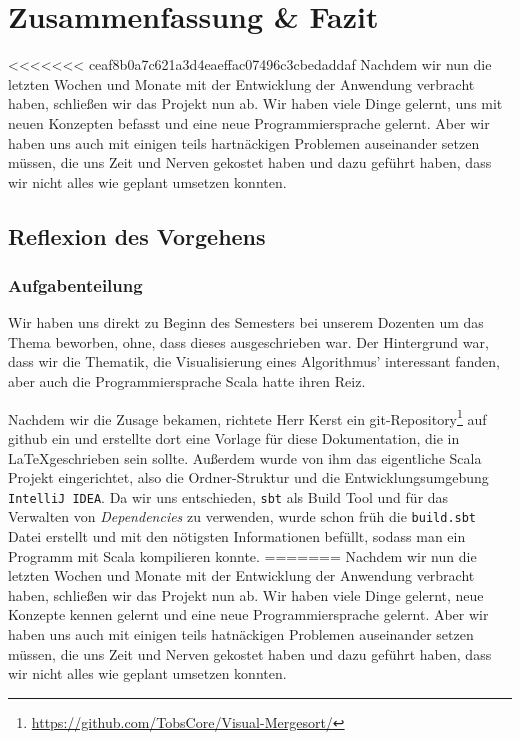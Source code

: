 \chapter{Zusammenfassung \& Fazit}\label{chap:zusammenfassung-und-fazit}
<<<<<<< ceaf8b0a7c621a3d4eaeffac07496c3cbedaddaf
Nachdem wir nun die letzten Wochen und Monate mit der Entwicklung der Anwendung verbracht haben, schließen wir das Projekt nun ab. Wir haben viele Dinge gelernt, uns mit neuen Konzepten befasst und eine neue Programmiersprache gelernt. Aber wir haben uns auch mit einigen teils hartnäckigen Problemen auseinander setzen müssen, die uns Zeit und Nerven gekostet haben und dazu geführt haben, dass wir nicht alles wie geplant umsetzen konnten.

\section{Reflexion des Vorgehens}\label{sec:reflexion}
\subsection{Aufgabenteilung}
Wir haben uns direkt zu Beginn des Semesters bei unserem Dozenten um das Thema beworben, ohne, dass dieses ausgeschrieben war. Der Hintergrund war, dass wir die Thematik, die Visualisierung eines Algorithmus' interessant fanden, aber auch die Programmiersprache Scala hatte ihren Reiz.

Nachdem wir die Zusage bekamen, richtete Herr Kerst ein git-Repository\footnote{\url{https://github.com/TobsCore/Visual-Mergesort/}} auf github ein und erstellte dort eine Vorlage für diese Dokumentation, die in \LaTeX geschrieben sein sollte. Außerdem wurde von ihm das eigentliche Scala Projekt eingerichtet, also die Ordner-Struktur und die Entwicklungsumgebung \texttt{IntelliJ IDEA}. Da wir uns entschieden, \texttt{sbt} als Build Tool und für das Verwalten von \textit{Dependencies} zu verwenden, wurde schon früh die \texttt{build.sbt} Datei erstellt und mit den nötigsten Informationen befüllt, sodass man ein Programm mit Scala kompilieren konnte.
=======
Nachdem wir nun die letzten Wochen und Monate mit der Entwicklung der Anwendung verbracht haben, schließen wir das Projekt nun ab. Wir haben viele Dinge gelernt, neue Konzepte kennen gelernt und eine neue Programmiersprache gelernt. Aber wir haben uns auch mit einigen teils hatnäckigen Problemen auseinander setzen müssen, die uns Zeit und Nerven gekostet haben und dazu geführt haben, dass wir nicht alles wie geplant umsetzen konnten.

